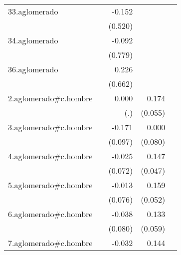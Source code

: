 {\begin{longtable}{l*{4}{D{.}{.}{-1}}}
\addlinespace
33.aglomerado&                     &      -0.152         &                     &                     \\
            &                     &     (0.520)         &                     &                     \\
\addlinespace
34.aglomerado&                     &      -0.092         &                     &                     \\
            &                     &     (0.779)         &                     &                     \\
\addlinespace
36.aglomerado&                     &       0.226         &                     &                     \\
            &                     &     (0.662)         &                     &                     \\
\addlinespace
2.aglomerado#c.hombre&                     &       0.000         &       0.174\sym{**} &                     \\
            &                     &         (.)         &     (0.055)         &                     \\
\addlinespace
3.aglomerado#c.hombre&                     &      -0.171         &       0.000         &                     \\
            &                     &     (0.097)         &     (0.080)         &                     \\
\addlinespace
4.aglomerado#c.hombre&                     &      -0.025         &       0.147\sym{**} &                     \\
            &                     &     (0.072)         &     (0.047)         &                     \\
\addlinespace
5.aglomerado#c.hombre&                     &      -0.013         &       0.159\sym{**} &                     \\
            &                     &     (0.076)         &     (0.052)         &                     \\
\addlinespace
6.aglomerado#c.hombre&                     &      -0.038         &       0.133\sym{*}  &                     \\
            &                     &     (0.080)         &     (0.059)         &                     \\
\addlinespace
7.aglomerado#c.hombre&                     &      -0.032         &       0.144\sym{*}  &                     \\

\end{longtable}}

